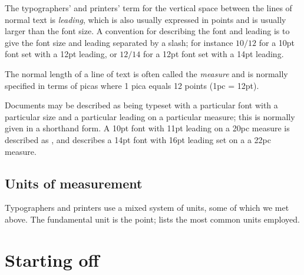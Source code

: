 \documentclass[10pt,a4paper,extrafontsizes]{memoir}
\begin{document}
    The typographers' and printers' term for the vertical space between
the lines of normal text is \emph{leading}, which is also
usually expressed in points and is usually larger than the font size.
A convention for describing the font and leading is to give the font size 
and leading separated by a slash; for instance $10/12$ for a
10pt font set with a 12pt leading, or $12/14$ for a 12pt font set with a
14pt leading.

    The normal length of a line of text is often called the 
\emph{measure} and is normally specified in terms of
picas where 1 pica equals 12 points (1pc = 12pt).

    Documents may be described as being typeset with a particular font
with a particular size and a particular leading on a particular measure;
this is normally given in a shorthand form. 
A 10pt font with 11pt leading on a 20pc measure is described as
, and  describes a 14pt font
with 16pt leading set on a a 22pc measure.

\section{Units of measurement}

    Typographers and printers use a mixed system of units, some of which
we met above. The fundamental unit is the point;  lists 
the most common units employed.



\cleardoublepage
{}

\mainmatter





\chapter{Starting off} \label{chap:starting}


    

\clearpage
\pagestyle{ruled}

\end{document}
